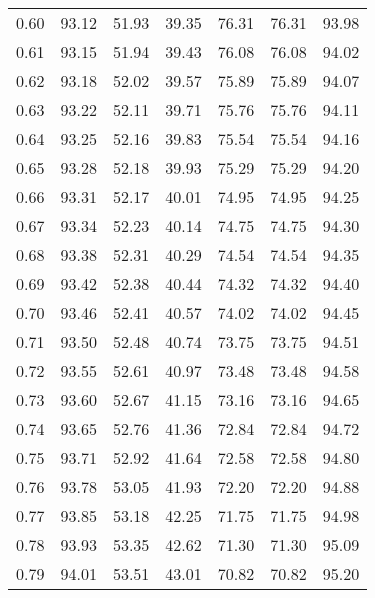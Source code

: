 \begin{tabular}{|c|c|c|c|c|c|c|}
      0.60 &     93.12 &     51.93 &      39.35 &   76.31 &      76.31 &         93.98 \\
      0.61 &     93.15 &     51.94 &      39.43 &   76.08 &      76.08 &         94.02 \\
      0.62 &     93.18 &     52.02 &      39.57 &   75.89 &      75.89 &         94.07 \\
      0.63 &     93.22 &     52.11 &      39.71 &   75.76 &      75.76 &         94.11 \\
      0.64 &     93.25 &     52.16 &      39.83 &   75.54 &      75.54 &         94.16 \\
      0.65 &     93.28 &     52.18 &      39.93 &   75.29 &      75.29 &         94.20 \\
      0.66 &     93.31 &     52.17 &      40.01 &   74.95 &      74.95 &         94.25 \\
      0.67 &     93.34 &     52.23 &      40.14 &   74.75 &      74.75 &         94.30 \\
      0.68 &     93.38 &     52.31 &      40.29 &   74.54 &      74.54 &         94.35 \\
      0.69 &     93.42 &     52.38 &      40.44 &   74.32 &      74.32 &         94.40 \\
      0.70 &     93.46 &     52.41 &      40.57 &   74.02 &      74.02 &         94.45 \\
      0.71 &     93.50 &     52.48 &      40.74 &   73.75 &      73.75 &         94.51 \\
      0.72 &     93.55 &     52.61 &      40.97 &   73.48 &      73.48 &         94.58 \\
      0.73 &     93.60 &     52.67 &      41.15 &   73.16 &      73.16 &         94.65 \\
      0.74 &     93.65 &     52.76 &      41.36 &   72.84 &      72.84 &         94.72 \\
      0.75 &     93.71 &     52.92 &      41.64 &   72.58 &      72.58 &         94.80 \\
      0.76 &     93.78 &     53.05 &      41.93 &   72.20 &      72.20 &         94.88 \\
      0.77 &     93.85 &     53.18 &      42.25 &   71.75 &      71.75 &         94.98 \\
      0.78 &     93.93 &     53.35 &      42.62 &   71.30 &      71.30 &         95.09 \\
      0.79 &     94.01 &     53.51 &      43.01 &   70.82 &      70.82 &         95.20 \\

\end{tabular}
